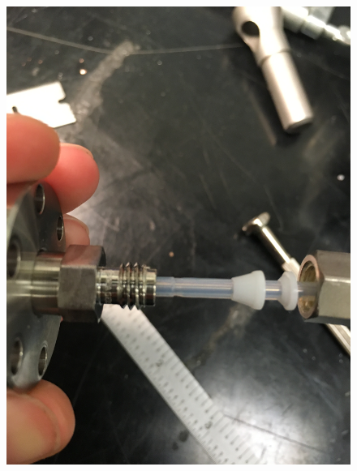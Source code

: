 \begin{figure}[htbp]
\begin{minipage}{0.47\textwidth}
    \includegraphics[width=\linewidth]{figures/testbed/ft5_1.jpg}
    \end{minipage}
    \hspace{\fill} %
    \begin{minipage}{0.47\textwidth}

\end{minipage}
\end{figure}
